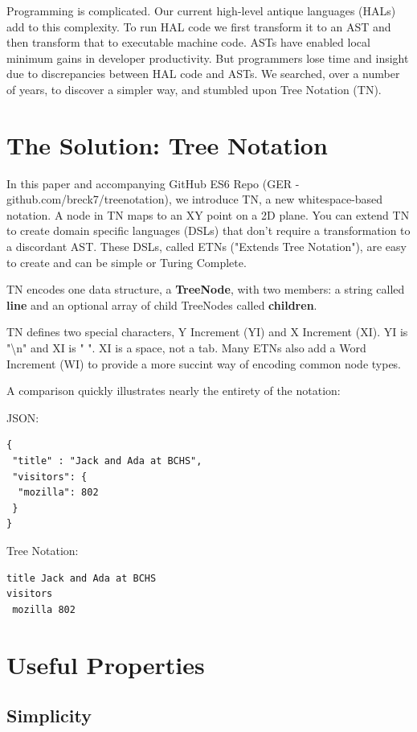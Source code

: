 \documentclass[journal]{IEEEtran}
\begin{document}
Programming is complicated. Our current high-level antique languages (HALs) add to this complexity. To run HAL code we first transform it to an AST and then transform that to executable machine code. ASTs have enabled local minimum gains in developer productivity. But programmers lose time and insight due to discrepancies between HAL code and ASTs. We searched, over a number of years, to discover a simpler way, and stumbled upon Tree Notation (TN).

\section{The Solution: Tree Notation}

In this paper and accompanying GitHub ES6 Repo (GER - github.com/breck7/treenotation), we introduce TN, a new whitespace-based notation. A node in TN maps to an XY point on a 2D plane. You can extend TN to create domain specific languages (DSLs) that don't require a transformation to a discordant AST. These DSLs, called ETNs ("Extends Tree Notation"), are easy to create and can be simple or Turing Complete.

TN encodes one data structure, a \textbf{TreeNode}, with two members: a string called \textbf{line} and an optional array of child TreeNodes called \textbf{children}.

TN defines two special characters, Y Increment (YI) and X Increment (XI). YI is "\textbackslash n" and XI is " ".  XI is a space, not a tab. Many ETNs also add a Word Increment (WI) to provide a more succint way of encoding common node types.

A comparison quickly illustrates nearly the entirety of the notation:

JSON:

\begin{lstlisting}
{
 "title" : "Jack and Ada at BCHS",
 "visitors": {
  "mozilla": 802
 }
}
\end{lstlisting}

Tree Notation:

\begin{lstlisting}
title Jack and Ada at BCHS
visitors
 mozilla 802
\end{lstlisting}

\section{Useful Properties}

\subsection{Simplicity}
\end{document}
